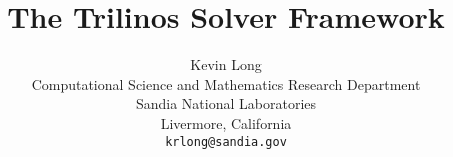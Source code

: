 \documentclass[10pt]{book}
\begin{document}
%



\title{The Trilinos Solver Framework}

\author{Kevin Long\\Computational Science and Mathematics Research Department\\
Sandia National Laboratories\\Livermore, California\\{\tt krlong@sandia.gov}}

\maketitle


\tableofcontents



















 

\clearpage



\end{document}
